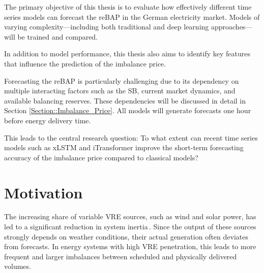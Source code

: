 \documentclass[class=scrbook, crop=false]{standalone}
\begin{document}

The primary objective of this thesis is to evaluate how effectively different time series models can forecast the \gls{reBAP} in the German electricity market. Models of varying complexity—including both traditional and deep learning approaches—will be trained and compared.

In addition to model performance, this thesis also aims to identify key features that influence the prediction of the imbalance price.

Forecasting the \gls{reBAP} is particularly challenging due to its dependency on multiple interacting factors such as the \gls{SB}, current market dynamics, and available balancing reserves. These dependencies will be discussed in detail in Section \ref{Section::Imbalance_Price}. All models will generate forecasts one hour before energy delivery time.

This leads to the central research question: To what extent can recent time series models such as xLSTM and iTransformer improve the short-term forecasting accuracy of the imbalance price compared to classical models?
\section{Motivation}
\label{Section::Motivation}


The increasing share of variable \gls{VRE} sources, such as wind and solar power, has led to a significant reduction in system inertia \cite{weitemeyerIntegrationRenewableEnergy2015}. Since the output of these sources strongly depends on weather conditions, their actual generation often deviates from forecasts. In energy systems with high \gls{VRE} penetration, this leads to more frequent and larger imbalances between scheduled and physically delivered volumes\cite{pavlikRenewableEnergyPrice2025}.
\end{document}
